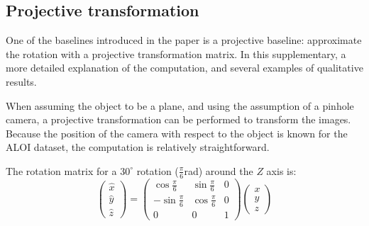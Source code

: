 \documentclass[runningheads]{llncs}
\begin{document}
\clearpage
\begin{appendix}
\section{Projective transformation}
One of the baselines introduced in the paper is a projective baseline: approximate the rotation with a projective transformation matrix.
In this supplementary, a more detailed explanation of the computation, and several examples of qualitative results.

When assuming the object to be a plane, and using the assumption of a pinhole camera, a projective transformation can be performed to transform the images.
Because the position of the camera with respect to the object is known for the ALOI dataset, the computation is relatively straightforward.

The rotation matrix for a $30^\circ$ rotation ($\tfrac{\pi}{6}$rad) around the $Z$ axis is:
\begin{equation} \label{eq:ex-bp-rot}
\begin{pmatrix} \hat{x}\\\hat{y}\\\hat{z} \end{pmatrix} = 
\begin{pmatrix} \cos\frac\pi6 & \sin\frac\pi6 & 0 \\ -\sin\frac\pi6 & \cos\frac\pi6 & 0 \\ 0 & 0 & 1 \end{pmatrix}
\begin{pmatrix} x\\y\\z \end{pmatrix}
\end{equation}


\end{appendix}
\end{document}
